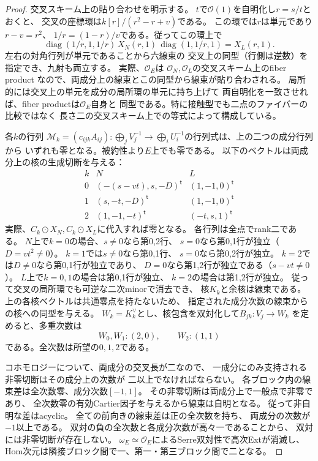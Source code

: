 \begin{proof}
交叉スキーム上の貼り合わせを明示する。
$t$で$\mathcal O(1)$を自明化し$r=s/t$とおくと、
交叉の座標環は$k[r]/(r^2-r+v)$である。
この環では$r$は単元であり$r-v=r^2$、
$1/r=(1-r)/v$である。従ってこの環上で
\[
 \operatorname{diag}(1/r,1,1/r)\,
 X_N(r,1)\,
 \operatorname{diag}(1,1/r,1)
 =X_L(r,1).
\]
左右の対角行列が単元であることから六線束の
交叉上の同型（行側は逆数）を指定でき、九射も両立する。
実際、$\mathcal O_E$は
$\mathcal O_N,\mathcal O_L$の交叉スキーム上のfiber product
なので、両成分上の線束とこの同型から線束が貼り合わされる。
局所的には交叉上の単元を成分の局所環の単元に持ち上げて
両自明化を一致させれば、fiber productは$\mathcal O_E$自身と
同型である。特に接触型でも二点のファイバーの比較ではなく
長さ二の交叉スキーム上での等式によって構成している。

各$k$の行列
$\mathscr M_k=(c_{ijk}A_{ij}):\bigoplus_jV_j^{-1}\to
\bigoplus_iU_i^{-1}$の行列式は、上の二つの成分行列から
いずれも零となる。被約性より$E$上でも零である。
以下のベクトルは両成分上の核の生成切断を与える：
\[
\begin{array}{c|c|c}
 k&N&L\\ \hline
0&(-(s-vt),s,-D)^{\mathsf t}&(1,-1,0)^{\mathsf t}\\
1&(s,-t,-D)^{\mathsf t}&(1,-1,0)^{\mathsf t}\\
2&(1,-1,-t)^{\mathsf t}&(-t,s,1)^{\mathsf t}
\end{array}
\]
実際、$C_k\odot X_N,C_k\odot X_L$に代入すれば零となる。
各行列は全点でrank二である。
$N$上で$k=0$の場合、$s\ne0$なら第0,2行、
$s=0$なら第0,1行が独立（$D=vt^2\ne0$）。
$k=1$では$s\ne0$なら第0,1行、
$s=0$なら第0,2行が独立。
$k=2$では$D\ne0$なら第0,1行が独立であり、
$D=0$なら第1,2行が独立である（$s-vt\ne0$）。
$L$上で$k=0,1$の場合は第0,1行が独立、
$k=2$の場合は第1,2行が独立。
従って交叉の局所環でも可逆な二次minorで消去でき、
核$K_k$と余核は線束である。
上の各核ベクトルは共通零点を持たないため、
指定された成分次数の線束からの核への同型を与える。
$W_k=K_k^\vee$とし、核包含を双対化して$B_{jk}:V_j\to W_k$
を定めると、多重次数は
\[
 W_0,W_1:(2,0),\qquad W_2:(1,1)
\]
である。全次数は所望の$0,1,2$である。

コホモロジーについて、両成分の交叉長が二なので、
一成分にのみ支持される非零切断はその成分上の次数が
二以上でなければならない。
各ブロック内の線束差は全次数零、成分次数$[-1,1]$。
その非零切断は両成分上で一般点で非零であり、
全次数零の有効Cartier因子を与えるから線束は自明となる。
従って非自明な差はacyclic。
全ての前向きの線束差は正の全次数を持ち、
両成分の次数が$-1$以上である。
双対の負の全次数と各成分次数が高々一であることから、
双対には非零切断が存在しない。
$\omega_E\simeq\mathcal O_E$によるSerre双対性で高次Extが消滅し、
Hom次元は隣接ブロック間で一、第一・第三ブロック間で二となる。


\end{proof}
